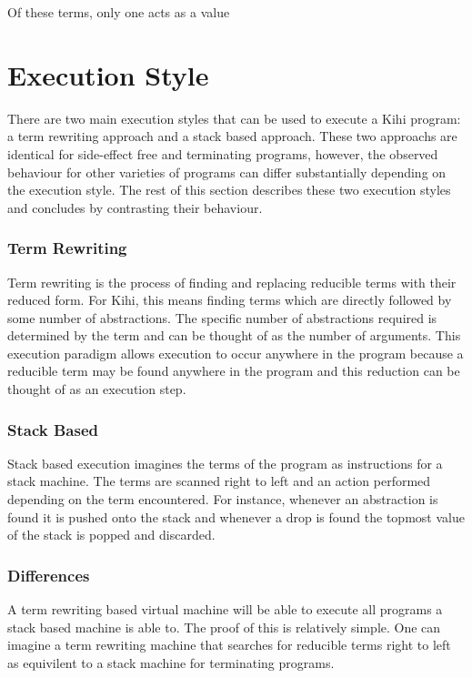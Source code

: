 Of these terms, only one acts as a value

\section{Execution Style}
There are two main execution styles that can be used to execute
a Kihi program: a term rewriting approach and a stack based 
approach. These two approachs are identical for side-effect
free and terminating programs, however, the observed
behaviour for other varieties of programs can differ
substantially depending on the execution style. The rest of 
this section describes these two execution styles and 
concludes by contrasting their behaviour.

\subsubsection{Term Rewriting}
Term rewriting is the process of finding
and replacing reducible terms with their reduced form. For Kihi,
this means finding terms which are directly followed by
some number of abstractions. The specific number of abstractions
required is determined by the term and can be thought of as the
number of arguments. This execution paradigm allows execution
to occur anywhere in the program because a reducible term may
be found anywhere in the program and this reduction can be
thought of as an execution step.

\subsubsection{Stack Based}
Stack based execution imagines the terms of the program as
instructions for a stack machine. The terms are scanned
right to left and an action performed depending on the term
encountered. For instance, whenever an abstraction is found
it is pushed onto the stack and whenever a drop is found the
topmost value of the stack is popped and discarded.

\subsubsection{Differences}
A term rewriting based virtual machine will be able to execute
all programs a stack based machine is able to. The proof of this
is relatively simple. One can imagine a term rewriting machine 
that searches for reducible terms right to left as equivilent to
a stack machine for terminating programs.

